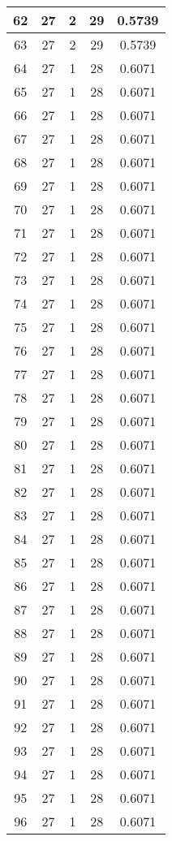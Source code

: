 \documentclass[letterpaper, 12pt]{article}
\begin{document}
\begin{longtable}{|c|c|c|c|c|}
\hline
62 & 27 & 2 & 29 & 0.5739 \\
\hline
63 & 27 & 2 & 29 & 0.5739 \\
\hline
64 & 27 & 1 & 28 & 0.6071 \\
\hline
65 & 27 & 1 & 28 & 0.6071 \\
\hline
66 & 27 & 1 & 28 & 0.6071 \\
\hline
67 & 27 & 1 & 28 & 0.6071 \\
\hline
68 & 27 & 1 & 28 & 0.6071 \\
\hline
69 & 27 & 1 & 28 & 0.6071 \\
\hline
70 & 27 & 1 & 28 & 0.6071 \\
\hline
71 & 27 & 1 & 28 & 0.6071 \\
\hline
72 & 27 & 1 & 28 & 0.6071 \\
\hline
73 & 27 & 1 & 28 & 0.6071 \\
\hline
74 & 27 & 1 & 28 & 0.6071 \\
\hline
75 & 27 & 1 & 28 & 0.6071 \\
\hline
76 & 27 & 1 & 28 & 0.6071 \\
\hline
77 & 27 & 1 & 28 & 0.6071 \\
\hline
78 & 27 & 1 & 28 & 0.6071 \\
\hline
79 & 27 & 1 & 28 & 0.6071 \\
\hline
80 & 27 & 1 & 28 & 0.6071 \\
\hline
81 & 27 & 1 & 28 & 0.6071 \\
\hline
82 & 27 & 1 & 28 & 0.6071 \\
\hline
83 & 27 & 1 & 28 & 0.6071 \\
\hline
84 & 27 & 1 & 28 & 0.6071 \\
\hline
85 & 27 & 1 & 28 & 0.6071 \\
\hline
86 & 27 & 1 & 28 & 0.6071 \\
\hline
87 & 27 & 1 & 28 & 0.6071 \\
\hline
88 & 27 & 1 & 28 & 0.6071 \\
\hline
89 & 27 & 1 & 28 & 0.6071 \\
\hline
90 & 27 & 1 & 28 & 0.6071 \\
\hline
91 & 27 & 1 & 28 & 0.6071 \\
\hline
92 & 27 & 1 & 28 & 0.6071 \\
\hline
93 & 27 & 1 & 28 & 0.6071 \\
\hline
94 & 27 & 1 & 28 & 0.6071 \\
\hline
95 & 27 & 1 & 28 & 0.6071 \\
\hline
96 & 27 & 1 & 28 & 0.6071 \\

\end{longtable}
\end{document}
